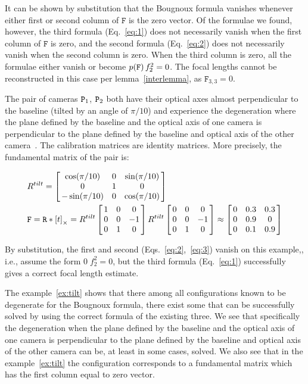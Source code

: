 It can be shown by substitution that the Bougnoux formula vanishes whenever either first or second column of $\mathtt{F}$ is the zero vector. Of the formulae we found, however, the third formula (Eq.~\ref{eq:1}) does not necessarily vanish when the first column of $\mathtt{F}$ is zero, and the second formula (Eq.~\ref{eq:2}) does not necessarily vanish when the second column is zero. When the third column is zero, all the formulae either vanish or become $p(\mathtt{F})\,f_2^2=0$. The focal lengths cannot be reconstructed in this case per lemma~\ref{interlemma}, as $\mathtt{F}_{3,3}=0$. 

\begin{exmp}
\label{ex:tilt}
The pair of cameras $\mathtt{P}_1$, $\mathtt{P}_2$ both have their optical axes almost perpendicular to the baseline (tilted by an angle of $\pi \slash 10$) and experience the degeneration where the plane defined by the baseline and the optical axis of one camera is perpendicular to the plane defined by the baseline and optical axis of the other camera~\cite{HartZiss}. The calibration matrices are identity matrices. More precisely, the fundamental matrix of the pair is:

\begin{align*}
    & R^{tilt} = \mat{ccc}{\cos (\pi \slash 10) & 0 & \sin (\pi \slash 10) \\ 0 & 1 & 0 \\ -\sin (\pi \slash 10) & 0 & \cos (\pi \slash 10)} \\
    & \M{F}= \M{R} * \cross{t} = R^{tilt}    
    \mat{ccc}{1 & 0 & 0 \\ 0 & 0 & -1 \\ 0 & 1 & 0}
    R^{tilt}
    \mat{ccc}{0 & 0 & 0 \\ 0 & 0 & -1 \\ 0 & 1 & 0} 
    \approx \mat{ccc}{0 & 0.3 & 0.3 \\ 0 & 0.9 & 0 \\ 0 & 0.1 & 0.9 }
\end{align*}


By substitution, the first and second (Eqs.~\ref{eq:2},~\ref{eq:3}) vanish on this example,, i.e., assume the form $  0 \; f_2^2 = 0 $, but the third formula (Eq.~\ref{eq:1}) successfully gives a correct focal length estimate.

\end{exmp}

The example~\ref{ex:tilt} shows that there among all configurations known to be degenerate for the Bougnoux formula, there exist some that can be successfully solved by using the correct formula of the existing three. We see that specifically the degeneration  when the plane defined by the baseline and the optical axis of one camera is perpendicular to the plane defined by the baseline and optical axis of the other camera can be, at least in some cases, solved. We also see that in the example~\ref{ex:tilt} the configuration corresponds to a fundamental matrix which has the first column equal to zero vector.


